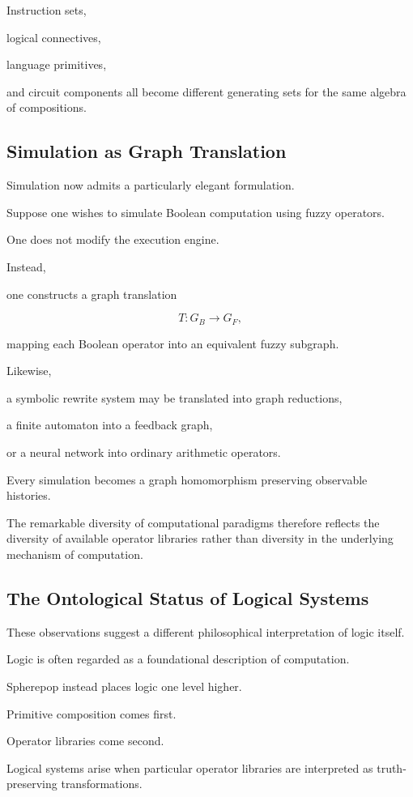 \documentclass[12pt,oneside]{article}
\begin{document}
Instruction sets,

logical connectives,

language primitives,

and circuit components all become different generating sets for the same algebra of compositions.

\subsection{Simulation as Graph Translation}

Simulation now admits a particularly elegant formulation.

Suppose one wishes to simulate Boolean computation using fuzzy operators.

One does not modify the execution engine.

Instead,

one constructs a graph translation

\[
T:G_B\rightarrow G_F,
\]

mapping each Boolean operator into an equivalent fuzzy subgraph.

Likewise,

a symbolic rewrite system may be translated into graph reductions,

a finite automaton into a feedback graph,

or a neural network into ordinary arithmetic operators.

Every simulation becomes a graph homomorphism preserving observable histories.

The remarkable diversity of computational paradigms therefore reflects the diversity of available operator libraries rather than diversity in the underlying mechanism of computation.

\subsection{The Ontological Status of Logical Systems}

These observations suggest a different philosophical interpretation of logic itself.

Logic is often regarded as a foundational description of computation.

Spherepop instead places logic one level higher.

Primitive composition comes first.

Operator libraries come second.

Logical systems arise when particular operator libraries are interpreted as truth-preserving transformations.
\end{document}
